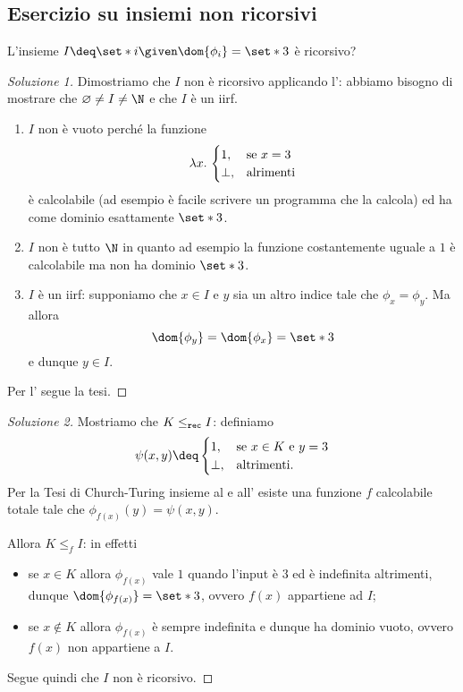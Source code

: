 \subsection*{Esercizio su insiemi non ricorsivi}

L'insieme $I \deq \set*{i \given \dom{\phi_i} = \set*{3}}$ è ricorsivo?

\begin{proof}
    [Soluzione 1]
    Dimostriamo che $I$ non è ricorsivo applicando l': abbiamo bisogno di mostrare che $\varnothing \neq I \neq \N$ e che $I$ è un iirf.
    \begin{enumerate}[(1)]
        \item $I$ non è vuoto perché la funzione \[
            \lambda{x}.\ {
                \begin{cases}
                    1, &\text{se } x = 3\\
                    \bot, &\text{alrimenti}
                \end{cases}
            }
        \] è calcolabile (ad esempio è facile scrivere un programma \WHILE{} che la calcola) ed ha come dominio esattamente $\set*{3}$.
        \item $I$ non è tutto $\N$ in quanto ad esempio la funzione costantemente uguale a $1$ è calcolabile ma non ha dominio $\set*{3}$.
        \item $I$ è un iirf: supponiamo che $x \in I$ e $y$ sia un altro indice tale che $\phi_x = \phi_y$. Ma allora \[
            \dom{\phi_y} = \dom{\phi_x} = \set*{3}
        \] e dunque $y \in I$. 
    \end{enumerate}

    Per l' segue la tesi.
\end{proof}

\begin{proof}
    [Soluzione 2]
    Mostriamo che $K \leq_{\texttt{rec}} I$: definiamo \[
        \psi(x, y) \deq \begin{cases}
            1, &\text{se } x \in K \text{ e } y = 3\\
            \bot, &\text{altrimenti.}
        \end{cases}
    \] Per la Tesi di Church-Turing insieme al  e all' esiste una funzione $f$ calcolabile totale tale che $\phi_{f(x)}(y) = \psi(x, y)$.
    
    Allora $K \leq_f I$: in effetti \begin{itemize}
        \item se $x \in K$ allora $\phi_{f(x)}$ vale $1$ quando l'input è $3$ ed è indefinita altrimenti, dunque $\dom{\phi_{f(x)}} = \set*{3}$, ovvero $f(x)$ appartiene ad $I$;
        \item se $x \notin K$ allora $\phi_{f(x)}$ è sempre indefinita e dunque ha dominio vuoto, ovvero $f(x)$ non appartiene a $I$.        
    \end{itemize}

    Segue quindi che $I$ non è ricorsivo.
\end{proof}